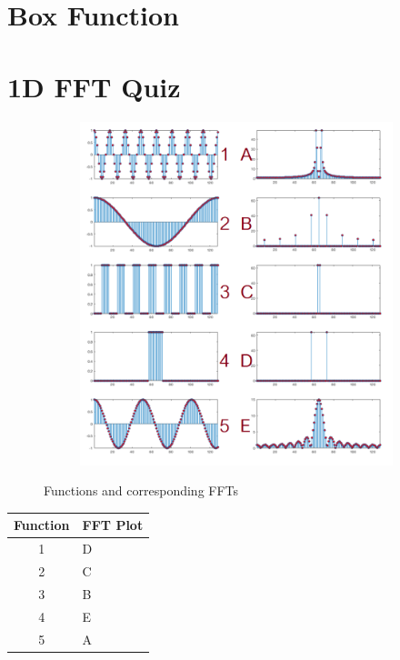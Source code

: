 \documentclass[12pt, oneside]{article}
\begin{document}
\section{Box Function}

\section{1D FFT Quiz}

\begin{figure}[H]
    \centering
    \begin{subfigure}[b]{1\textwidth}
        \centering
        \includegraphics[width=\textwidth]{imgs/q5_matching.png}
    \end{subfigure}
    \caption{Functions and corresponding FFTs}
\end{figure}

\begin{table}[H]
    \centering
    \begin{tabular}{|c|l|}
    \hline
    \multicolumn{1}{|l|}{\textbf{Function}} & \textbf{FFT Plot} \\ \hline
    1                                       & D                 \\ \hline
    2                                       & C                 \\ \hline
    3                                       & B                 \\ \hline
    4                                       & E                 \\ \hline
    5                                       & A                 \\ \hline
    \end{tabular}
\end{table}
\end{document}

